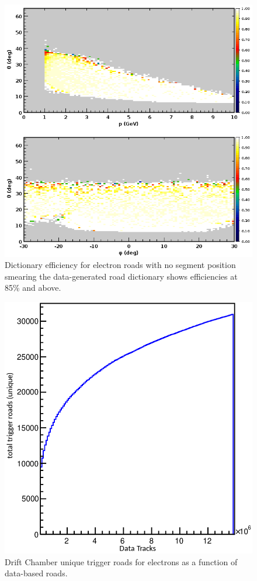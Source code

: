 \begin{figure}[hbt]
	\centering
	\includegraphics[width=1.0\columnwidth,keepaspectratio]{img/dc_neg_data_efficiency_nosmearing.png}
	\caption{Dictionary efficiency for electron roads with no segment position smearing the data-generated
          road dictionary shows efficiencies at 85\% and above.}
	\label{fig:dc_neg_data_efficiency_nosmearing}
\end{figure}

\begin{figure}[hbt]
	\centering
	\includegraphics[width=0.85\columnwidth,keepaspectratio]{img/dc_neg_data_dictionary.png}
	\caption{Drift Chamber unique trigger roads for electrons as a function of data-based roads.}
	\label{fig:dc_neg_data_dictionary}
\end{figure}

